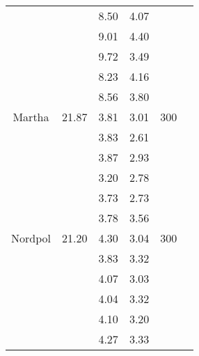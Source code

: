 \begin{table}
\begin{tabular}{cccccc}
	& & 8.50 & 4.07 & & \\
	& & 9.01 & 4.40 & & \\
	& & 9.72 & 3.49 & & \\
	& & 8.23 & 4.16 & & \\
	& & 8.56 & 3.80 & & \\
	\hline
	Martha & 21.87 & 3.81 & 3.01 & 300 & \\
	& & 3.83 & 2.61 & & \\
	& & 3.87 & 2.93 & & \\
	& & 3.20 & 2.78 & & \\
	& & 3.73 & 2.73 & & \\
	& & 3.78 & 3.56 & & \\
	\hline
	Nordpol & 21.20 & 4.30 & 3.04 & 300 & \\
	& & 3.83 & 3.32 & & \\
	& & 4.07 & 3.03 & & \\
	& & 4.04 & 3.32 & & \\
	& & 4.10 & 3.20 & & \\
	& & 4.27 & 3.33 & & \\
	\hline
\end{tabular}
\end{table}
